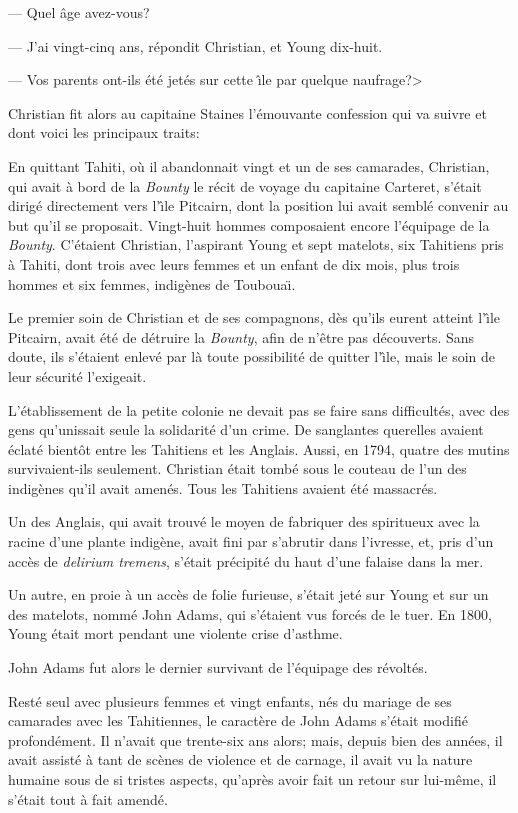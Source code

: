 --- Quel \^age avez-vous?

--- J'ai vingt-cinq ans, r\'epondit Christian, et Young dix-huit.

--- Vos parents ont-ils \'et\'e jet\'es
sur cette {\^\i}le par quelque naufrage?>

Christian fit alors au capitaine Staines l'\'emouvante
confession qui va suivre et dont voici les principaux traits:

En quittant Tahiti, o\`u il abandonnait vingt et un
de ses camarades, Christian, qui avait \`a bord de
la {\sl Bounty\/} le r\'ecit de voyage du capitaine Carteret,
s'\'etait dirig\'e directement vers l'{\^\i}le Pitcairn,
dont la position lui avait sembl\'e convenir au but qu'il se
proposait. Vingt-huit hommes composaient encore l'\'equipage
de la {\sl Bounty\/}. C'\'etaient Christian, l'aspirant Young
et sept matelots, six Tahitiens pris \`a Tahiti, dont trois
avec leurs femmes et un enfant de dix mois, plus trois hommes
et six femmes, indig\`enes de Touboua\"\i. %

Le premier soin de Christian et de ses compagnons, d\`es
qu'ils eurent atteint l'{\^\i}le Pitcairn, avait \'et\'e
de d\'etruire la {\sl Bounty}, afin de n'\^etre pas
d\'ecouverts. Sans doute, ils s'\'etaient enlev\'e
par l\`a toute possibilit\'e de quitter l'{\^\i}le,
mais le soin de leur s\'ecurit\'e l'exigeait.

L'\'etablissement de la petite colonie ne devait pas
se faire sans difficult\'es, avec des gens qu'unissait
seule la solidarit\'e d'un crime. De sanglantes querelles
avaient \'eclat\'e bient\^ot entre les Tahitiens
et les Anglais. Aussi, en 1794, quatre des mutins survivaient-ils
seulement. Christian \'etait tomb\'e sous le couteau
de l'un des indig\`enes qu'il avait amen\'es.
Tous les Tahitiens avaient \'et\'e massacr\'es.

Un des Anglais, qui avait trouv\'e le moyen de fabriquer
des spi\-ri\-tueux avec la racine d'une plante indig\`ene,
avait fini par s'abrutir dans l'ivresse, et, pris d'un acc\`es
de {\sl delirium tremens}, s'\'etait pr\'ecipit\'e
du haut d'une falaise dans la mer.

Un autre, en proie \`a un acc\`es de folie furieuse,
s'\'etait jet\'e sur Young et sur un des matelots, nomm\'e
John Adams, qui s'\'etaient vus forc\'es de le tuer. En
1800, Young \'etait mort pendant une violente crise d'asthme.

John Adams fut alors le dernier survivant de l'\'equipage
des r\'evolt\'es.

Rest\'e seul avec plusieurs femmes et vingt enfants,
n\'es du mariage de ses camarades avec les Tahitiennes,
le caract\`ere de John Adams s'\'etait modifi\'e
profond\'ement. Il n'avait que trente-six ans alors;
mais, depuis bien des ann\'ees, il avait assist\'e
\`a tant de sc\`enes de violence et de carnage,
il avait vu la nature humaine sous de si tristes aspects,
qu'apr\`es avoir fait un retour sur lui-m\^eme,
il s'\'etait tout \`a fait amend\'e.

